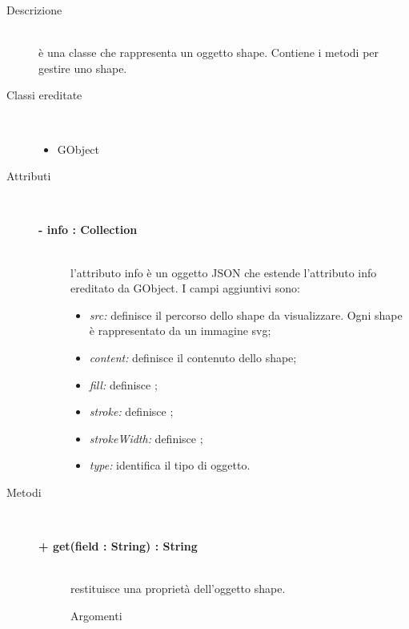 \begin{description}
\item[Descrizione] \hfill \\
	è una classe che rappresenta un oggetto shape. Contiene i metodi per gestire uno shape.
	
\item[Classi ereditate] \hfill \\
	\begin{itemize}
		\item GObject
	\end{itemize}
	
\item[Attributi] \hfill \\
	\begin{description}
		\item[\textbf{- info : Collection			}] \hfill \\
			l'attributo info è un oggetto JSON che estende l'attributo info ereditato da GObject. I campi aggiuntivi sono:
	\begin{itemize}
		\item \textit{src:} definisce il percorso dello shape da visualizzare. Ogni shape è rappresentato da un immagine svg;
		\item \textit{content:} definisce il contenuto dello shape;		
		\item \textit{fill:} definisce ; %
        \item \textit{stroke:} definisce ; %
        \item \textit{strokeWidth:} definisce ; %
		\item \textit{type:} identifica il tipo di oggetto.		
	\end{itemize}
	\end{description}
	
\item[Metodi] \hfill \\

\begin{description}
		\item[\textbf{\color{blue}+ get(field : String) : String			}] \hfill \\
			restituisce una proprietà dell'oggetto shape.
			
		\begin{description}
			\item[Argomenti] \hfill \\
				\begin{itemize}
				

\end{itemize}
\end{description}
\end{description}
\end{description}
